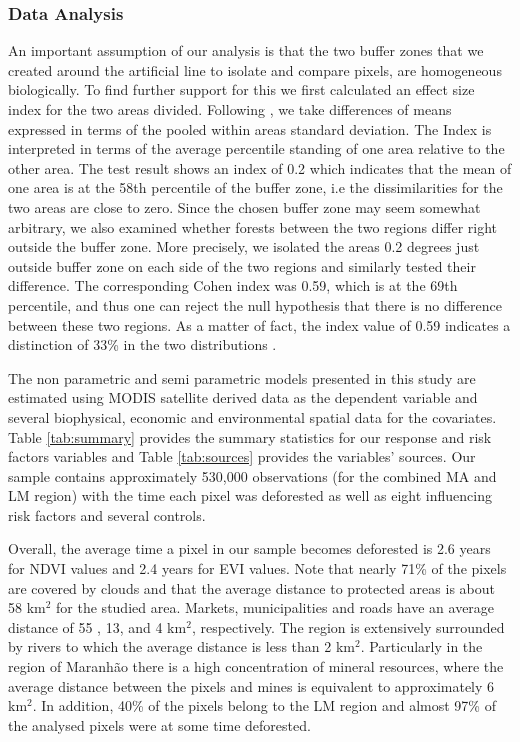 \subsubsection{Data Analysis}  %
An important assumption of our analysis is that the two buffer zones that we created around the artificial line to isolate and compare pixels, are homogeneous biologically. To find further support for this we first calculated an effect size index for the two areas divided. Following \citet{COHEN1977}, we take differences of means expressed in terms of the pooled within areas standard deviation. The Index is interpreted in terms of the average percentile standing of one area relative to the other area. The test result shows an index of 0.2 which indicates that the mean of one area is at the 58th percentile of the buffer zone, i.e the dissimilarities for the two areas are close to zero.  Since the chosen buffer zone may seem somewhat arbitrary, we also examined whether forests between the two regions differ right outside the buffer zone.  More precisely, we isolated the areas 0.2 degrees just outside buffer zone on each side of the two regions and similarly tested their difference.  The corresponding Cohen index was 0.59, which is at the 69th percentile,  and thus one can reject the null hypothesis that there is no difference between these two regions. As a matter of fact, the index value of 0.59 indicates a distinction of 33\% in the two distributions \citep{COHEN1977}.


The non parametric and semi parametric models presented in this study are estimated using MODIS satellite derived data as the dependent variable and several biophysical, economic and environmental spatial data for the covariates. Table \ref{tab:summary} provides the summary statistics for our response and risk factors variables and Table \ref{tab:sources} provides the variables' sources. Our sample contains approximately 530,000 observations (for the combined MA and LM region) with the time each pixel was deforested as well as eight influencing risk factors and several controls.

Overall, the average time a pixel in our sample becomes deforested is 2.6 years for NDVI values and 2.4 years for EVI values. Note that nearly 71\% of the pixels are covered by clouds and that the average distance to protected areas is about 58 km$^{2}$ for the studied area. Markets, municipalities and roads have an average distance of 55 , 13,  and 4 km$^{2}$, respectively. The region is extensively surrounded by rivers to which the average distance is less than 2 km$^{2}$. Particularly in the region of Maranhão there is a high concentration of mineral resources, where the average distance between the pixels and mines is equivalent to approximately 6 km$^{2}$. In addition, 40\% of the pixels belong to the LM region and almost 97\% of the analysed pixels were at some time deforested.

